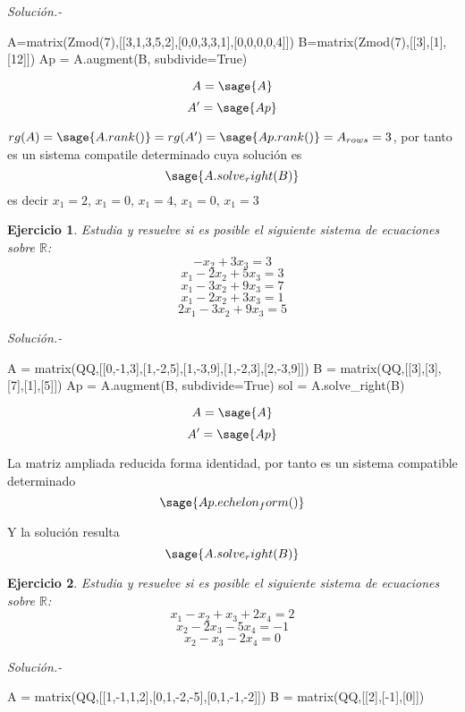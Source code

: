 \documentclass{amsart}
\newtheorem{ejer}{Ejercicio}
\def\r{\mathbb{R}}
\begin{document}
{\it Soluci\'on.-}


\begin{sageblock}
A=matrix(Zmod(7),[[3,1,3,5,2],[0,0,3,3,1],[0,0,0,0,4]])
B=matrix(Zmod(7),[[3],[1],[12]])
Ap = A.augment(B, subdivide=True)
\end{sageblock}

$$
A = \sage{A}
$$
$$
A' = \sage{Ap}
$$

$rg(A) = \sage{A.rank()} = rg(A') = \sage{Ap.rank()} = A_{rows} = 3$, por tanto es un sistema compatile determinado cuya solución es
$$
\sage{A.solve_right(B)}
$$
es decir $x_1 = 2$, $x_1 = 0$, $x_1 = 4$, $x_1 = 0$, $x_1 = 3$


\begin{ejer} Estudia y resuelve si es posible el siguiente sistema de ecuaciones sobre $\r $:
\[ -x_{2} + 3 x_{3} = 3 \]
\[ x_{1} - 2 x_{2} + 5 x_{3} = 3 \]
\[ x_{1} - 3 x_{2} + 9 x_{3} = 7 \]
\[ x_{1} - 2 x_{2} + 3 x_{3} = 1 \]
\[ 2 x_{1} - 3 x_{2} + 9 x_{3} = 5 \]
\end{ejer}

{\it Soluci\'on.-}

\begin{sageblock}
A = matrix(QQ,[[0,-1,3],[1,-2,5],[1,-3,9],[1,-2,3],[2,-3,9]])
B = matrix(QQ,[[3],[3],[7],[1],[5]])
Ap = A.augment(B, subdivide=True)
sol = A.solve_right(B)
\end{sageblock}

$$
	A = \sage{A}
$$
$$
	A' = \sage{Ap}
$$

La matriz ampliada reducida forma identidad, por tanto es un sistema compatible determinado
$$
	\sage{Ap.echelon_form()}
$$

Y la solución resulta
$$
	\sage{A.solve_right(B)}
$$


\begin{ejer} Estudia y resuelve si es posible el siguiente sistema de ecuaciones sobre $\r $:
\[ x_{1} - x_{2} + x_{3} + 2 x_{4} = 2 \]
\[ x_{2} - 2 x_{3} - 5 x_{4} = -1 \]
\[ x_{2} - x_{3} - 2 x_{4} = 0 \]
\end{ejer}

{\it Soluci\'on.-}

\begin{sageblock}
A = matrix(QQ,[[1,-1,1,2],[0,1,-2,-5],[0,1,-1,-2]])
B = matrix(QQ,[[2],[-1],[0]])

\end{sageblock}
\end{document}
